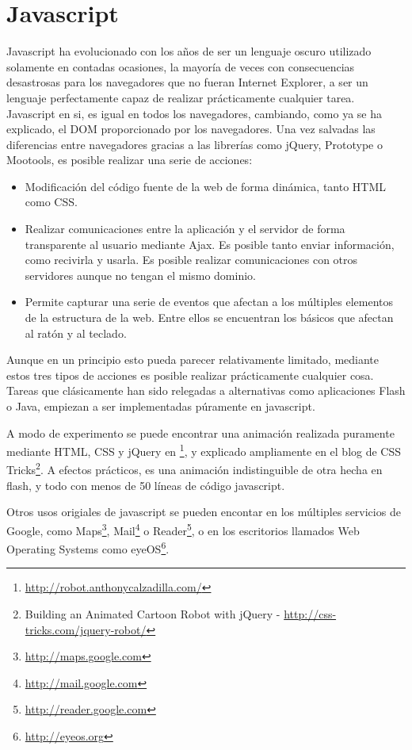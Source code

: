 \section{Javascript} %
\label{sec:javascript}

Javascript ha evolucionado con los años de ser un lenguaje oscuro utilizado solamente en contadas ocasiones, la mayoría de veces con consecuencias desastrosas para los navegadores que no fueran Internet Explorer, a ser un lenguaje perfectamente capaz de realizar prácticamente cualquier tarea. Javascript en si, es igual en todos los navegadores, cambiando, como ya se ha explicado, el DOM proporcionado por los navegadores. Una vez salvadas las diferencias entre navegadores gracias a las librerías como jQuery, Prototype o Mootools, es posible realizar una serie de acciones:

\begin{itemize}
  \item Modificación del código fuente de la web de forma dinámica, tanto HTML como CSS.
  \item Realizar comunicaciones entre la aplicación y el servidor de forma transparente al usuario mediante Ajax. Es posible tanto enviar información, como recivirla y usarla. Es posible realizar comunicaciones con otros servidores aunque no tengan el mismo dominio.
  \item Permite capturar una serie de eventos que afectan a los múltiples elementos de la estructura de la web. Entre ellos se encuentran los básicos que afectan al ratón y al teclado.
\end{itemize}

Aunque en un principio esto pueda parecer relativamente limitado, mediante estos tres tipos de acciones es posible realizar prácticamente cualquier cosa. Tareas que clásicamente han sido relegadas a alternativas como aplicaciones Flash o Java, empiezan a ser implementadas púramente en javascript.

A modo de experimento se puede encontrar una animación realizada puramente mediante HTML, CSS y jQuery en \footnote{\url{http://robot.anthonycalzadilla.com/}}, y explicado ampliamente en el blog de CSS Tricks\footnote{Building an Animated Cartoon Robot with jQuery - \url{http://css-tricks.com/jquery-robot/}}. A efectos prácticos, es una animación indistinguible de otra hecha en flash, y todo con menos de 50 líneas de código javascript.

Otros usos origiales de javascript se pueden encontar en los múltiples servicios de Google, como Maps\footnote{\url{http://maps.google.com}}, Mail\footnote{\url{http://mail.google.com}} o Reader\footnote{\url{http://reader.google.com}}, o en los escritorios llamados Web Operating Systems como eyeOS\footnote{\url{http://eyeos.org}}.

